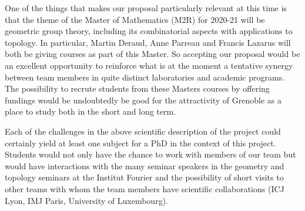 \documentclass[14pt,fleqn]{article}
\begin{document}


\vspace{.25in}



One of the things that makes
our proposal particularly relevant
at this time is that
the theme of the  Master of
Mathematics (M2R) for 2020-21
will be  geometric group theory, 
including its combinatorial aspects with applications to topology. 
In particular, Martin Deraud, Anne Parreau and Francis Lazarus will both be giving courses as part of  this Master. 
So accepting our proposal 
would be  an excellent opportunity 
to reinforce
what is at the moment a tentative synergy 
between team members in
quite distinct laboratories and
academic programs. 
The possibility to recrute 
students from these Masters courses
by offering fundings 
would be undoubtedly 
be good for the attractivity
of Grenoble as a place to study
both in the short and long term. 

Each of the challenges  in the above scientific description of the project
could certainly yield 
at least one subject for a PhD
in the context of this project.
Students would not only have the chance
to work with members of our team 
but would have interactions with
the  many seminar speakers 
in the geometry and topology seminars 
at the Institut Fourier
and the possibility of short visits
to other teams with whom the team members
have scientific collaborations
(ICJ Lyon, IMJ Paris, University of Luxembourg).
\end{document}
